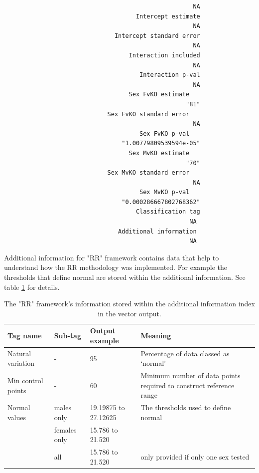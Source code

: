 \documentclass[12pt,a4paper]{article}
\begin{document}
\begin{verbatim}
                                                     NA 
                                     Intercept estimate 
                                                     NA 
                               Intercept standard error 
                                                     NA 
                                   Interaction included 
                                                     NA 
                                      Interaction p-val 
                                                     NA 
                                   Sex FvKO estimate 
                                                   "81" 
                             Sex FvKO standard error 
                                                     NA 
                                      Sex FvKO p-val 
                                 "1.00779809539594e-05" 
                                   Sex MvKO estimate 
                                                   "70" 
                             Sex MvKO standard error 
                                                     NA 
                                      Sex MvKO p-val 
                                 "0.000286667802768362" 
                                     Classification tag 
													NA
								Additional information
													NA
\end{verbatim}
\endgroup

Additional information for "RR" framework contains data that help to understand how the RR methodology was implemented. For example the thresholds that define normal are stored within the additional information. See table \ref{table:071} for details. 

\begin{table}
 
\begin{tabular}{| l | p{2.5cm} |  p{2cm}  | p{5cm} |}
  \hline
Tag name&Sub-tag&Output example&Meaning\\\hline
Natural variation&-&95&Percentage of data classed as ‘normal’\\
Min control points&-&60&
Minimum number of data points required to construct reference range\\
Normal values&males only&19.19875 to 27.12625&The thresholds used to define normal\\
&females only&15.786 to 21.520&\\
&all&15.786 to 21.520&only provided if only one sex tested\\
\hline  
\end{tabular}
\caption{The "RR" framework's information stored within the additional information index in the vector output. }\label{table:071}
\end{table}
\end{document}
